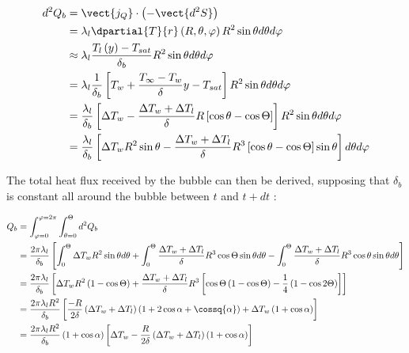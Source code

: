 \begin{align}
d^{2}Q_{b}&=\vect{j_{Q}} \cdot \left(-\vect{d^{2}S}\right)\\
&=\lambda_{l} \dpartial{T}{r}\left(R,\theta, \varphi\right) R^{2}\sin{\theta} d\theta d\varphi\\
&\approx\lambda_{l} \frac{T_{l}\left(y\right)-T_{sat}}{\delta_{b}}R^{2}\sin{\theta}d\theta d\varphi\\
&=\lambda_{l} \frac{1}{\delta_{b}}\left[T_{w}+\frac{T_{\infty}-T_{w}}{\delta}y - T_{sat}\right]R^{2}\sin{\theta}d\theta d\varphi\\
&=\frac{\lambda_{l}}{\delta_{b}}\left[\Delta T_{w}-\frac{\Delta T_{w} + \Delta T_{l}}{\delta}R\left[\cos{\theta} - \cos{\Theta}\right]\right]R^{2}\sin{\theta}d\theta d\varphi\\
&=\frac{\lambda_{l}}{\delta_{b}}\left[\Delta T_{w}R^{2}\sin{\theta}-\frac{\Delta T_{w}+\Delta T_{l}}{\delta}R^{3}\left[\cos{\theta}-\cos{\Theta}\right]\sin{\theta}\right] d\theta d\varphi
\end{align}

\npar
The total heat flux received by the bubble can then be derived, supposing that $\delta_{b}$ is constant all around the bubble between $t$ and $t+dt$ :

\begin{align}
Q_{b}&=\int_{\varphi=0}^{\varphi=2\pi} \int_{\theta=0}^{\Theta}{d^{2}Q_{b}}\\
&= \frac{2\pi \lambda_{l}}{\delta_{b}}\left[\int_{0}^{\Theta} \Delta T_{w} R^{2} \sin{\theta}d\theta + \int_{0}^{\Theta} \frac{\Delta T_{w} + \Delta T_{l}}{\delta} R^{3} \cos{\Theta}\sin{\theta}d\theta - \int_{0}^{\Theta} \frac{\Delta T_{w} + \Delta T_{l}}{\delta} R^{3} \cos{\theta}\sin{\theta}d\theta\right]\\
&=\frac{2\pi \lambda_{l}}{\delta_{b}} \left[\Delta T_{w} R^{2} \left(1-\cos{\Theta}\right) + \frac{\Delta T_{w} + \Delta T_{l}}{\delta}R^{3}\left[\cos{\Theta}\left(1-\cos{\Theta}\right)- \frac{1}{4}\left(1 - \cos{2\Theta}\right)\right]\right]\\
&=\frac{2\pi \lambda_{l} R^{2}}{\delta_{b}}\left[\frac{-R}{2\delta}\left(\Delta T_{w} + \Delta T_{l}\right)\left(1 + 2\cos{\alpha} + \cossq{\alpha}\right) + \Delta T_{w} \left(1 + \cos{\alpha } \right) \right]\\
&=\frac{2\pi \lambda_{l} R^{2}}{\delta_{b}}\left(1+\cos{\alpha}\right)\left[\Delta T_{w} - \frac{R}{2\delta}\left(\Delta T_{w} + \Delta T_{l}\right) \left(1 + \cos {\alpha} \right )\right]
\end{align}


